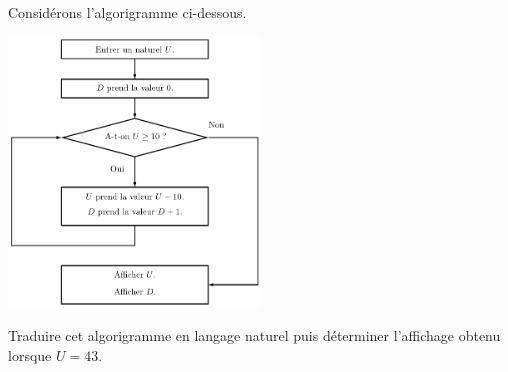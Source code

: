 Considérons l'algorigramme ci-dessous.
\begin{center}
	\includegraphics[width=0.5\textwidth]{reading/draw/while_loop.pdf}
\end{center}
Traduire cet algorigramme en langage naturel puis déterminer l'affichage obtenu lorsque $U = 43$.